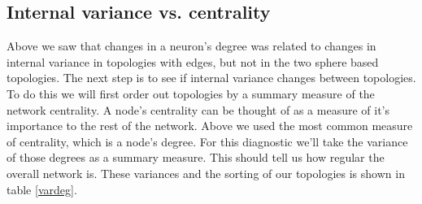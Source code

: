 \begin{table}[hbt]
\centering
\caption{These tables show the difference in mean IV between each group of
neurons grouped by their degree, delta (significance),
t=9999, *** = 99\%, ** = 95\%, * = 90\%}
\label{rlt}



\end{table}

\subsection{Internal variance vs. centrality}
Above we saw that changes in a neuron's degree was related to changes in
internal variance in topologies with edges, but not in the two sphere based
topologies. The next step is to see if internal variance changes between
topologies.  To do this we will first order out topologies by a summary
measure of the network centrality.  A node's centrality can be thought of as a
measure of it's importance to the rest of the network. Above we used the most
common measure of centrality, which is a node's degree.  For this diagnostic
we'll take the variance of those degrees as a summary measure.  This should
tell us how regular the overall network is.  These variances and the sorting
of our topologies is shown in table \ref{vardeg}.

